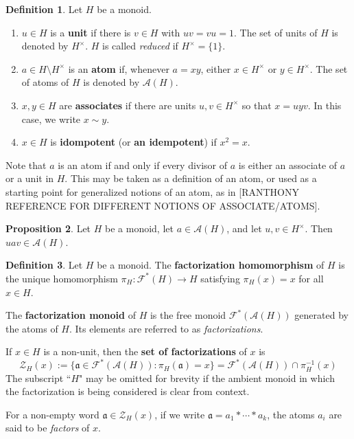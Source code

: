 \documentclass{report}
\newcommand{\A}{\mathcal{A}}
\renewcommand{\aa}{\mathfrak{a}}
\newcommand{\F}{\mathcal{F}}
\newcommand{\Z}{\mathcal{Z}}
\renewcommand{\:}{\text{:}}
\theoremstyle{definition}
\newtheorem{defn}{Definition}[section]
\newtheorem{prop}[defn]{Proposition}
\begin{document}
\begin{defn}
Let $H$ be a monoid.
\begin{enumerate}
\item $u\in H$ is a \textbf{unit} if there is $v\in H$ with $uv = vu = 1$.  
The set of units of $H$ is denoted by $H^\times$.  
$H$ is called \textit{reduced} if $H^\times = \{1\}$.
\item $a\in H\setminus H^\times$ is an \textbf{atom} if, whenever $a = xy$, either $x\in H^\times$ or $y\in H^\times$. The set of atoms of $H$ is denoted by $\A(H)$.
\item $x,y\in H$ are \textbf{associates} if there are units $u,v\in H^\times$ so that $x = uyv$. In this case, we write $x \sim y$.
\item $x\in H$ is \textbf{idompotent} (or \textbf{an idempotent}) if $x^2 = x$.
\end{enumerate}
\end{defn}

Note that $a$ is an atom if and only if every divisor of $a$ is either an associate of $a$ or a unit in $H$.
This may be taken as a definition of an atom, or used as a starting point for generalized notions of an atom, as in [RANTHONY REFERENCE FOR DIFFERENT NOTIONS OF ASSOCIATE/ATOMS].

\begin{prop}
Let $H$ be a monoid, let $a\in \A(H)$, and let $u,v\in H^\times$.
Then $uav \in \A(H)$.
\end{prop}

\begin{defn}
Let $H$ be a monoid.
The \textbf{factorization homomorphism} of $H$ is the unique homomorphism $\pi_H: \F^*(H) \to H$ satisfying $\pi_H(x) = x$ for all $x\in H$.

The \textbf{factorization monoid} of $H$ is the free monoid $\F^*(\A(H))$ generated by the atoms of $H$.
Its elements are referred to as \textit{factorizations}.

If $x\in H$ is a non-unit, then the \textbf{set of factorizations} of $x$ is
\[ \Z_H(x) := \{ \aa\in \F^*(\A(H)) : \pi_H(\aa) = x \} = \F^*(\A(H)) \cap \pi_H^{-1}(x) \]
The subscript ``$H$" may be omitted for brevity if the ambient monoid in which the factorization is being considered is clear from context.

For a non-empty word $\aa\in \Z_H(x)$, if we write $\aa = a_1*\cdots*a_k$, the atoms $a_i$ are said to be \textit{factors} of $x$.
\end{defn}
\end{document}
